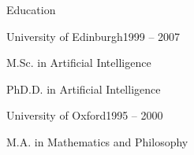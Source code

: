 \documentclass{resume} %
\begin{document}

\begin{rSection}{Education}
\begin{rSubsection}{University of Edinburgh}{1999 -- 2007}{}{}
\item M.Sc. in Artificial Intelligence
\item PhD.D. in Artificial Intelligence
\end{rSubsection}

\begin{rSubsection}{University of Oxford}{1995 -- 2000}{}{}
\item M.A. in Mathematics and Philosophy
\end{rSubsection}
\end{rSection}

\end{document}
